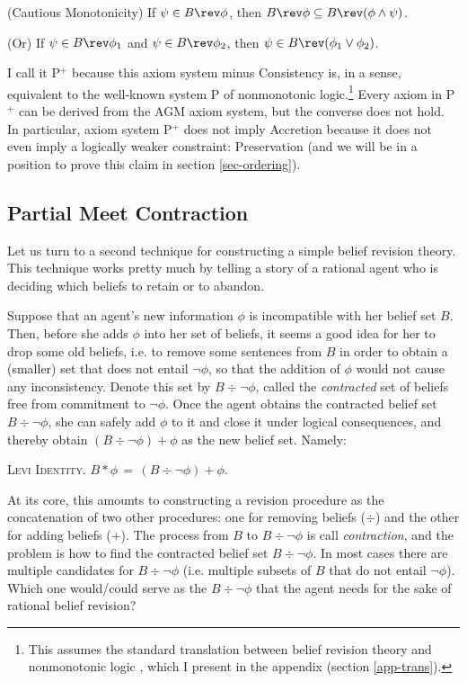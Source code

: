 	\xm (Cautious Monotonicity) If $\psi \in B \rev \phi$, then $B \rev \phi \subseteq B \rev (\phi \wedge \psi)$.

	\xm (Or) If $\psi \in B \rev \phi_1$ and $\psi \in B \rev \phi_2$, then $\psi \in B \rev (\phi_1 \vee \phi_2)$.

\ed I call it P$^{+}$ because this axiom system minus Consistency is, in a sense, equivalent to the well-known system P of nonmonotonic logic.\footnote
	{
	This assumes the standard translation between belief revision theory and nonmonotonic logic \citep*{makinson1991relations}, which I present in the appendix (section \ref{app-trans}).
	}
Every axiom in P$^+$ can be derived from the AGM axiom system, but the converse does not hold. In particular, axiom system P$^+$ does not imply Accretion because it does not even imply a logically weaker constraint: Preservation (and we will be in a position to prove this claim in section \ref{sec-ordering}).

\subsection{Partial Meet Contraction}\label{sec-contraction}

Let us turn to a second technique for constructing a simple belief revision theory. This technique works pretty much by telling a story of a rational agent who is deciding which beliefs to retain or to abandon. 

Suppose that an agent's new information $\phi$ is incompatible with her belief set $B$. Then, before she adds $\phi$ into her set of beliefs, it seems a good idea for her to drop some old beliefs, i.e. to remove some sentences from $B$ in order to obtain a (smaller) set that does not entail $\neg\phi$, so that the addition of $\phi$ would not cause any inconsistency. Denote this set by $B \div \neg\phi$, called the {\em contracted} set of beliefs free from commitment to $\neg \phi$. Once the agent obtains the contracted belief set $B \div \neg\phi$, she can safely add $\phi$ to it and close it under logical consequences, and thereby obtain $(B \div \neg\phi) + \phi$ as the new belief set. Namely:\op

	\xm \textsc{Levi Identity.} $B * \phi \,=\, (B \div \neg\phi) + \phi$. 

\ed At its core, this amounts to constructing a revision procedure as the concatenation of two other procedures: one for removing beliefs ($\div$) and the other for adding beliefs ($+$).  The process from $B$ to $B \div \neg\phi$ is call {\em contraction}, and the problem is how to find the contracted belief set $B \div \neg\phi$. In most cases there are multiple candidates for $B \div \neg\phi$ (i.e. multiple subsets of $B$ that do not entail $\neg\phi$). Which one would/could serve as the $B \div \neg\phi$ that the agent needs for the sake of rational belief revision? 

